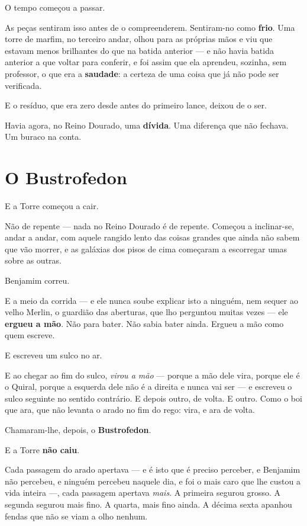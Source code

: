 \documentclass[livro.tex]{subfiles}
\begin{document}
O tempo começou a passar.

\medskip

As peças sentiram isso antes de o compreenderem. Sentiram-no como \textbf{frio}. Uma torre de marfim, no terceiro
andar, olhou para as próprias mãos e viu que estavam menos brilhantes do que na batida anterior --- e não havia
batida anterior a que voltar para conferir, e foi assim que ela aprendeu, sozinha, sem professor, o que era a
\textbf{saudade}: a certeza de uma coisa que já não pode ser verificada.

E o resíduo, que era zero desde antes do primeiro lance, deixou de o ser.

Havia agora, no Reino Dourado, uma \textbf{dívida}. Uma diferença que não fechava. Um buraco na conta.

\section*{O Bustrofedon}

E a Torre começou a cair.

Não de repente --- nada no Reino Dourado é de repente. Começou a inclinar-se, andar a andar, com aquele rangido
lento das coisas grandes que ainda não sabem que vão morrer, e as galáxias dos pisos de cima começaram a
escorregar umas sobre as outras.

Benjamim correu.

E a meio da corrida --- e ele nunca soube explicar isto a ninguém, nem sequer ao velho Merlin, o guardião das aberturas, que lho perguntou muitas
vezes --- ele \textbf{ergueu a mão}. Não para bater. Não sabia bater ainda. Ergueu a mão como quem escreve.

E escreveu um sulco no ar.

E ao chegar ao fim do sulco, \emph{virou a mão} --- porque a mão dele vira, porque ele é o Quiral, porque a
esquerda dele não é a direita e nunca vai ser --- e escreveu o sulco seguinte no sentido contrário. E depois outro,
de volta. E outro. Como o boi que ara, que não levanta o arado no fim do rego: vira, e ara de volta.

Chamaram-lhe, depois, o \textbf{Bustrofedon}.

\medskip

E a Torre \textbf{não caiu}.

Cada passagem do arado apertava --- e é isto que é preciso perceber, e Benjamim não percebeu, e ninguém percebeu
naquele dia, e foi o mais caro que lhe custou a vida inteira ---, cada passagem apertava \emph{mais}. A primeira
segurou grosso. A segunda segurou mais fino. A quarta, mais fino ainda. A décima sexta apanhou fendas que não se
viam a olho nenhum.
\end{document}
